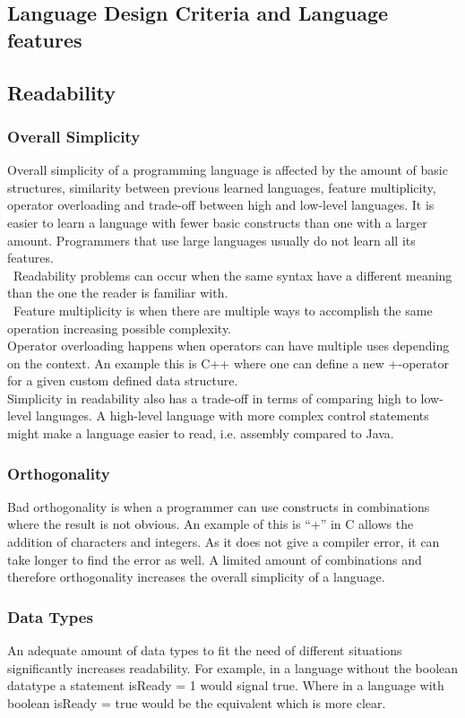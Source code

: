 \subsection{Language Design Criteria and Language features}
\label{design-criteria-theory}
\subsection*{Readability}
\subsubsection*{Overall Simplicity}
Overall simplicity of a programming language is affected by the amount of basic structures, similarity between previous learned languages, feature multiplicity, operator overloading and trade-off between high and low-level languages.
It is easier to learn a language with fewer basic constructs than one with a larger amount. Programmers that use large languages usually do not learn all its features. \\\
Readability problems can occur when the same syntax have a different meaning than the one the reader is familiar with. \\\
Feature multiplicity is when there are multiple ways to accomplish the same operation increasing possible complexity. \\
Operator overloading happens when operators can have multiple uses depending on the context. An example this is C++ where one can define a new +-operator for a given custom defined data structure. \\
Simplicity in readability also has a trade-off in terms of comparing high to low-level languages. A high-level language with more complex control statements might make a language easier to read, i.e. assembly compared to Java.

\subsubsection*{Orthogonality}
Bad orthogonality is when a programmer can use constructs in combinations where the result is not obvious. An example of this is “+” in C allows the addition of characters and integers. As it does not give a compiler error, it can take longer to find the error as well.
A limited amount of combinations and therefore orthogonality increases the overall simplicity of a language.

\subsubsection*{Data Types}
An adequate amount of data types to fit the need of different situations significantly increases readability. For example, in a language without the boolean datatype a statement
isReady = 1 would signal true. Where in a language with boolean isReady = true would be the equivalent which is more clear.

